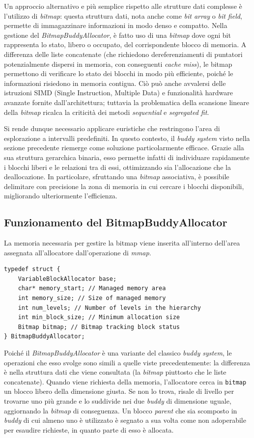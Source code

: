 Un approccio alternativo e più semplice rispetto alle strutture dati complesse è l’utilizzo di \textit{bitmap}: questa struttura dati, nota anche come \textit{bit array} o \textit{bit field}, permette di immagazzinare informazioni in modo denso e compatto.  Nella gestione del \textit{BitmapBuddyAllocator}, è fatto uso di una \textit{bitmap} dove ogni bit rappresenta lo stato, libero o occupato, del corrispondente blocco di memoria. A differenza delle liste concatenate (che richiedono dereferenziamenti di puntatori potenzialmente dispersi in memoria, con conseguenti \textit{cache miss}), le bitmap permettono di verificare lo stato dei blocchi in modo più efficiente, poiché le informazioni risiedono in memoria contigua. Ciò può anche avvalersi delle istruzioni SIMD (Single Instruction, Multiple Data) e funzionalità hardware avanzate fornite dall’architettura; tuttavia la problematica della scansione lineare della \textit{bitmap} ricalca la criticità dei metodi \textit{sequential} e \textit{segregated fit}.

Si rende dunque necessario applicare euristiche che restringono l’area di esplorazione a intervalli predefiniti. In questo contesto, il \textit{buddy system} visto nella sezione precedente riemerge come soluzione particolarmente efficace. Grazie alla sua struttura gerarchica binaria, esso permette infatti di individuare rapidamente i blocchi liberi e le relazioni tra di essi, ottimizzando sia l’allocazione che la deallocazione. In particolare, sfruttando una \textit{bitmap} associativa, è possibile delimitare con precisione la zona di memoria in cui cercare i blocchi disponibili, migliorando ulteriormente l’efficienza.

\subsection*{Funzionamento del BitmapBuddyAllocator}
La memoria necessaria per gestire la bitmap viene inserita all'interno dell'area assegnata all'allocatore dall'operazione di \textit{mmap}.
\begin{lstlisting}
typedef struct {
    VariableBlockAllocator base; 
    char* memory_start; // Managed memory area
    int memory_size; // Size of managed memory
    int num_levels; // Number of levels in the hierarchy
    int min_block_size; // Minimum allocation size
    Bitmap bitmap; // Bitmap tracking block status
} BitmapBuddyAllocator;
\end{lstlisting}

Poiché il \textit{BitmapBuddyAllocator} è una variante del classico \textit{buddy system}, le operazioni che esso svolge sono simili a quelle viste precedentemente: la differenza è nella struttura dati che viene consultata (la \textit{bitmap} piuttosto che le liste concatenate). Quando viene richiesta della memoria, l’allocatore cerca in \lstinline[]|bitmap| un blocco libero della dimensione giusta. Se non lo trova, risale di livello per trovarne uno più grande e lo suddivide nei due \textit{buddy} di dimensione uguale, aggiornando la \textit{bitmap} di conseguenza. Un blocco \textit{parent} che sia scomposto in \textit{buddy} di cui almeno uno è utilizzato è segnato a sua volta come non adoperabile per esaudire richieste, in quanto parte di esso è allocata.

